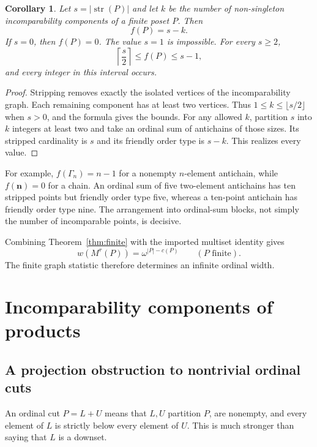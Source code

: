\documentclass[11pt,letterpaper]{article}
\newtheorem{corollary}[theorem]{Corollary}
\theoremstyle{definition}
\theoremstyle{remark}
\newcommand{\str}{\operatorname{str}}
\newcommand{\chain}[1]{\mathbf{#1}}
\newcommand{\anti}[1]{\Gamma_{#1}}
\begin{document}
\begin{corollary}\label{cor:finite-strip}
Let $s=|\str(P)|$ and let $k$ be the number of non-singleton
incomparability components of a finite poset $P$. Then
\[
 f(P)=s-k.
\]
If $s=0$, then $f(P)=0$. The value $s=1$ is impossible. For every $s\ge2$,
\begin{equation}\label{eq:sharp-finite-bounds}
 \left\lceil\frac{s}{2}\right\rceil\le f(P)\le s-1,
\end{equation}
and every integer in this interval occurs.
\end{corollary}
\begin{proof}
Stripping removes exactly the isolated vertices of the incomparability
graph. Each remaining component has at least two vertices. Thus
$1\le k\le\lfloor s/2\rfloor$ when $s>0$, and the formula gives the bounds.
For any allowed $k$, partition $s$ into $k$ integers at least two and take
an ordinal sum of antichains of those sizes. Its stripped cardinality is
$s$ and its friendly order type is $s-k$. This realizes every value.
\end{proof}

For example, $f(\anti n)=n-1$ for a nonempty $n$-element antichain, while
$f(\chain n)=0$ for a chain. An ordinal sum of five two-element antichains
has ten stripped points but friendly order type five, whereas a ten-point
antichain has friendly order type nine. The arrangement into ordinal-sum
blocks, not simply the number of incomparable points, is decisive.

Combining Theorem~\ref{thm:finite} with the imported multiset identity gives
\begin{equation}\label{eq:finite-multiset}
 w(M^r(P))=\omega^{|P|-c(P)}
 \qquad(P\text{ finite}).
\end{equation}
The finite graph statistic therefore determines an infinite ordinal width.

\section{Incomparability components of products}\label{sec:products}

\subsection{A projection obstruction to nontrivial ordinal cuts}
An ordinal cut $P=L+U$ means that $L,U$ partition $P$, are nonempty, and
every element of $L$ is strictly below every element of $U$. This is much
stronger than saying that $L$ is a downset.
\end{document}
